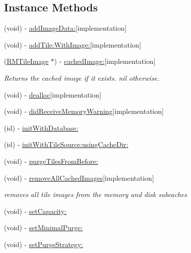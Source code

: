 \subsection*{Instance Methods}
\begin{DoxyCompactItemize}
\item 
(void) -\/ \hyperlink{interface_r_m_database_cache_ade3ba936e084cd27dd8baa6556df2409}{add\-Image\-Data\-:}{\ttfamily  \mbox{[}implementation\mbox{]}}
\item 
(void) -\/ \hyperlink{interface_r_m_database_cache_aa6e7191032fd7ee788d9566f93dcb124}{add\-Tile\-:\-With\-Image\-:}{\ttfamily  \mbox{[}implementation\mbox{]}}
\item 
(\hyperlink{interface_r_m_tile_image}{R\-M\-Tile\-Image} $\ast$) -\/ \hyperlink{interface_r_m_database_cache_a5b954b244864b84cc490815c841883fa}{cached\-Image\-:}{\ttfamily  \mbox{[}implementation\mbox{]}}
\begin{DoxyCompactList}\small\item\em Returns the cached image if it exists. nil otherwise. \end{DoxyCompactList}\item 
(void) -\/ \hyperlink{interface_r_m_database_cache_afbb97c4847de1495061d21d60e4e1066}{dealloc}{\ttfamily  \mbox{[}implementation\mbox{]}}
\item 
(void) -\/ \hyperlink{interface_r_m_database_cache_a22549fd820b0fb903d787b9235354199}{did\-Receive\-Memory\-Warning}{\ttfamily  \mbox{[}implementation\mbox{]}}
\item 
(id) -\/ \hyperlink{interface_r_m_database_cache_a19c0d0753815dc491d87f1a0a3c85ec6}{init\-With\-Database\-:}
\item 
(id) -\/ \hyperlink{interface_r_m_database_cache_a5991d40d229df8c26fc8f358ecafe569}{init\-With\-Tile\-Source\-:using\-Cache\-Dir\-:}
\item 
(void) -\/ \hyperlink{interface_r_m_database_cache_a03d0d4bee7287e82ca4db041a4434b1f}{purge\-Tiles\-From\-Before\-:}
\item 
(void) -\/ \hyperlink{interface_r_m_database_cache_a6b1d9c5a4c26b936ddd5bb837046760e}{remove\-All\-Cached\-Images}{\ttfamily  \mbox{[}implementation\mbox{]}}
\begin{DoxyCompactList}\small\item\em removes all tile images from the memory and disk subcaches \end{DoxyCompactList}\item 
(void) -\/ \hyperlink{interface_r_m_database_cache_a9815ce5f25d2dbc8f7f186e6d4ab9678}{set\-Capacity\-:}
\item 
(void) -\/ \hyperlink{interface_r_m_database_cache_a638f3d74205233c988fd727c163fc2bf}{set\-Minimal\-Purge\-:}
\item 
(void) -\/ \hyperlink{interface_r_m_database_cache_aefea28907d48132dbd79475ab385a497}{set\-Purge\-Strategy\-:}
\end{DoxyCompactItemize}
